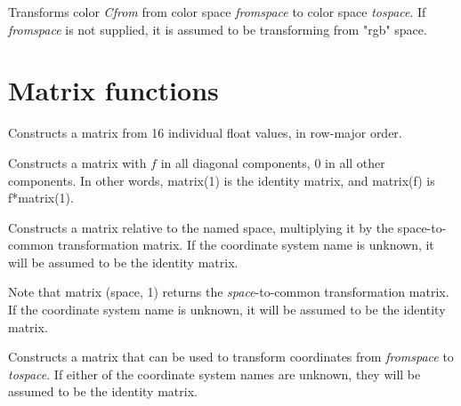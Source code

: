 \documentclass[11pt,letterpaper]{book}
\def\float{{\cf float}\xspace}
\def\matrix{{\cf matrix}\xspace}
\def\rgbspace{{\cf "rgb"} space\xspace}
\begin{document}
Transforms color \emph{Cfrom} from color space \emph{fromspace} to
color space \emph{tospace}.  If \emph{fromspace} is not supplied,
it is assumed to be transforming from \rgbspace.

\apiend


\section{Matrix functions}
\label{sec:stdlib:matrix}

Constructs a \matrix from 16 individual \float values, in row-major
order.  
\apiend

Constructs a \matrix with $f$ in all diagonal components, 0 in all other
components.  In other words, {\cf matrix(1)} is the identity matrix, and
{\cf matrix(f)} is {\cf f*matrix(1)}.
\apiend

Constructs a \matrix relative to the named space, multiplying it by the
{\cf space}-to-{\cf common} transformation matrix.  If the coordinate
system name is unknown, it will be assumed to be the identity matrix.

Note that {\cf matrix (space, 1)} returns the 
\emph{space}-to-{\cf common} transformation matrix. If the coordinate
system name is unknown, it will be assumed to be the identity matrix.
\apiend

Constructs a \matrix that can be used to transform coordinates from
\emph{fromspace} to \emph{tospace}.  If either of the coordinate
system names are unknown, they will be assumed to be the identity matrix.
\apiend
\end{document}
